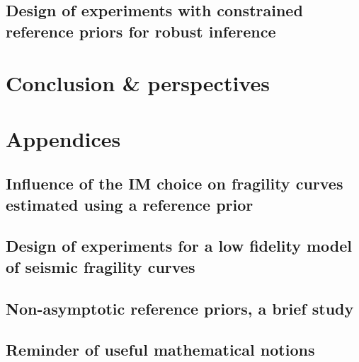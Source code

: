 \documentclass[a4paper]{book}
\begin{document}



\chapter{Design of experiments with constrained reference priors for robust inference%
}\label{chap:doe}






\part{Conclusion \& perspectives}\label{part:conclusion}


\appendix
\part*{Appendices}\label{part:appendix}


\chapter{Influence of the IM choice on fragility curves estimated using a reference prior}\label{app:chap:uncecomp}



\chapter{Design of experiments for a low fidelity model of seismic fragility curves}\label{app:chap:ESAIM}




\chapter{Non-asymptotic reference priors, a brief study}




\chapter{Reminder of useful mathematical notions}
\end{document}
